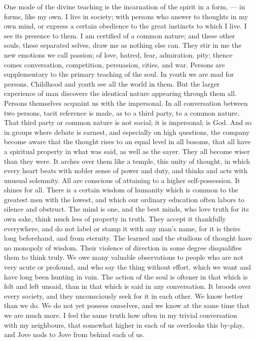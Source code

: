 \documentclass{article}
\begin{document}
One mode of the divine teaching is the incarnation of the spirit in a form, --- in forms, like my own. I live in society; with persons who answer to thoughts in my own mind, or express a certain obedience to the great instincts to which I live. I see its presence to them. I am certified of a common nature; and these other souls, these separated selves, draw me as nothing else can. They stir in me the new emotions we call passion; of love, hatred, fear, admiration, pity; thence comes conversation, competition, persuasion, cities, and war. Persons are supplementary to the primary teaching of the soul. In youth we are mad for persons. Childhood and youth see all the world in them. But the larger experience of man discovers the identical nature appearing through them all. Persons themselves acquaint us with the impersonal. In all conversation between two persons, tacit reference is made, as to a third party, to a common nature. That third party or common nature is not social; it is impersonal; is God. And so in groups where debate is earnest, and especially on high questions, the company become aware that the thought rises to an equal level in all bosoms, that all have a spiritual property in what was said, as well as the sayer. They all become wiser than they were. It arches over them like a temple, this unity of thought, in which every heart beats with nobler sense of power and duty, and thinks and acts with unusual solemnity. All are conscious of attaining to a higher self-possession. It shines for all. There is a certain wisdom of humanity which is common to the greatest men with the lowest, and which our ordinary education often labors to silence and obstruct. The mind is one, and the best minds, who love truth for its own sake, think much less of property in truth. They accept it thankfully everywhere, and do not label or stamp it with any man's name, for it is theirs long beforehand, and from eternity. The learned and the studious of thought have no monopoly of wisdom. Their violence of direction in some degree disqualifies them to think truly. We owe many valuable observations to people who are not very acute or profound, and who say the thing without effort, which we want and have long been hunting in vain. The action of the soul is oftener in that which is felt and left unsaid, than in that which is said in any conversation. It broods over every society, and they unconsciously seek for it in each other. We know better than we do. We do not yet possess ourselves, and we know at the same time that we are much more. I feel the same truth how often in my trivial conversation with my neighbours, that somewhat higher in each of us overlooks this by-play, and Jove nods to Jove from behind each of us.
\end{document}
